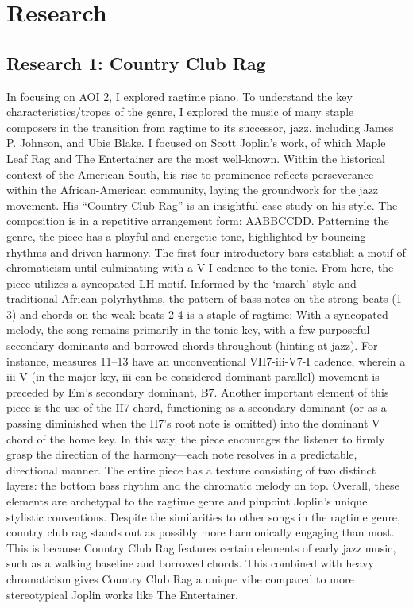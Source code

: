 \documentclass[11pt,a4paper]{article}
\begin{document}
\section{Research}

\subsection{Research 1: Country Club Rag}

In focusing on AOI 2, I explored ragtime piano. To understand the key characteristics/tropes of the genre, I explored the music of many staple composers in the transition from ragtime to its successor, jazz, including James P. Johnson, and Ubie Blake. I focused on Scott Joplin’s work, of which Maple Leaf Rag and The Entertainer are the most well-known. Within the historical context of the American South, his rise to prominence reflects perseverance within the African-American community, laying the groundwork for the jazz movement.
His “Country Club Rag” is an insightful case study on his style. The composition is in a repetitive arrangement form: AABBCCDD. Patterning the genre, the piece has a playful and energetic tone, highlighted by bouncing rhythms and driven harmony. The first four introductory bars establish a motif of chromaticism until culminating with a V-I cadence to the tonic. From here, the piece utilizes a syncopated LH motif. Informed by the ‘march’ style and traditional African polyrhythms, the pattern of bass notes on the strong beats (1-3) and chords on the weak beats 2-4 is a staple of ragtime: With a syncopated melody, the song remains primarily in the tonic key, with a few purposeful secondary dominants and borrowed chords throughout (hinting at jazz). For instance, measures 11–13 have an unconventional VII7-iii-V7-I cadence, wherein a iii-V (in the major key, iii can be considered dominant-parallel) movement is preceded by Em's secondary dominant, B7. Another important element of this piece is the use of the II7 chord, functioning as a secondary dominant (or as a passing diminished when the II7’s root note is omitted) into the dominant V chord of the home key. In this way, the piece encourages the listener to firmly grasp the direction of the harmony—each note resolves in a predictable, directional manner. The entire piece has a texture consisting of two distinct layers: the bottom bass rhythm and the chromatic melody on top. Overall, these elements are archetypal to the ragtime genre and pinpoint Joplin’s unique stylistic conventions. Despite the similarities to other songs in the ragtime genre, country club rag stands out as possibly more harmonically engaging than most. This is because Country Club Rag features certain elements of early jazz music, such as a walking baseline and borrowed chords. This combined with heavy chromaticism gives Country Club Rag a unique vibe compared to more stereotypical Joplin works like The Entertainer.\autocite{joplin}
\end{document}
